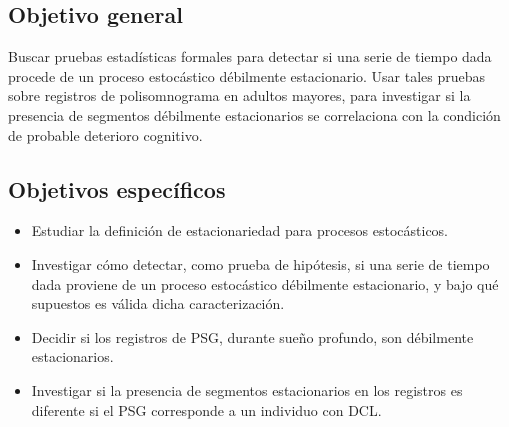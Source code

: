 
\subsection{Objetivo general}

Buscar pruebas estadísticas formales para detectar si una serie de tiempo dada procede de un 
proceso estocástico débilmente estacionario.
%
Usar tales pruebas sobre registros de polisomnograma en adultos mayores, para investigar si la 
presencia de segmentos débilmente estacionarios se correlaciona con la condición de probable
deterioro cognitivo.


\subsection{Objetivos específicos}

\begin{itemize}
\item Estudiar la definición de estacionariedad para procesos estocásticos.

\item Investigar cómo detectar, como prueba de hipótesis, si una serie de tiempo dada proviene
de un proceso estocástico débilmente estacionario, y bajo qué supuestos 
es válida dicha caracterización.

\item Decidir si los registros de PSG, durante sueño profundo, son débilmente estacionarios.

\item Investigar si la presencia de segmentos estacionarios en los registros es diferente si el
PSG corresponde a un individuo con DCL.
\end{itemize}

